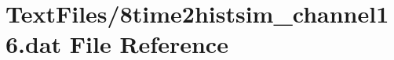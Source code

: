 \hypertarget{8time2histsim__channel16_8dat}{}\section{Text\+Files/8time2histsim\+\_\+channel16.dat File Reference}
\label{8time2histsim__channel16_8dat}
